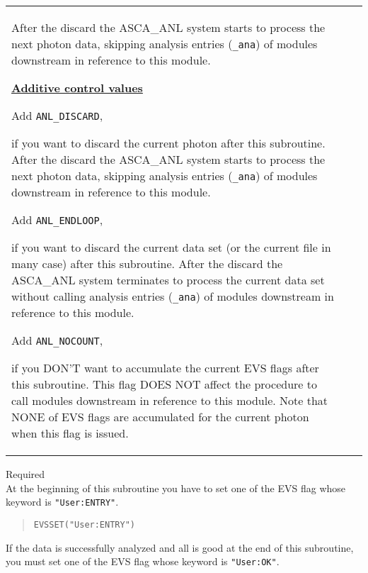 \begin{description}
\begin{tabular}{l@{\ (}c@{)\ }p{}}
{            After the discard
            the ASCA\_ANL system starts to process the next photon data,
            skipping analysis entries ({\tt *\_ana}) of modules
            downstream in reference to this module.
        }\par
        \bigskip
        \underline{\bf Additive control values} \par
        Add {\tt ANL\_DISCARD},\par
        \hfill\parbox{0.65\textwidth}{
            if you want to discard the current photon after this subroutine.
            After the discard
            the ASCA\_ANL system starts to process the next photon data,
            skipping analysis entries ({\tt *\_ana}) of modules
            downstream in reference to this module.
        }\par
        Add {\tt ANL\_ENDLOOP},\par
        \hfill\parbox{0.65\textwidth}{
            if you want to discard the current data set (or the current file
            in many case) after this subroutine.
            After the discard
            the ASCA\_ANL system terminates to process the current data set
            without calling analysis entries ({\tt *\_ana}) of modules 
            downstream in reference to this module.
        }\par
        Add {\tt ANL\_NOCOUNT},\par
        \hfill\parbox{0.65\textwidth}{
            if you DON'T want to accumulate the current EVS flags
            after this subroutine.
            This flag DOES NOT affect the procedure to call modules
            downstream in reference to this module.
            Note that NONE of EVS flags are accumulated for the current photon
            when this flag is issued.
        }\par\\
 \end{tabular}\newpage
\item{Required} \\
   At the beginning of this subroutine you have to set one of the EVS flag
   whose keyword is {\tt "User:ENTRY"}.
\begin{quote}\baselineskip 3.2mm\begin{verbatim}
EVSSET("User:ENTRY")
\end{verbatim}\end{quote}
   If the data is successfully analyzed and all is good at the end of this 
   subroutine,
   you must set one of the EVS flag whose keyword is {\tt "User:OK"}.

\end{description}
